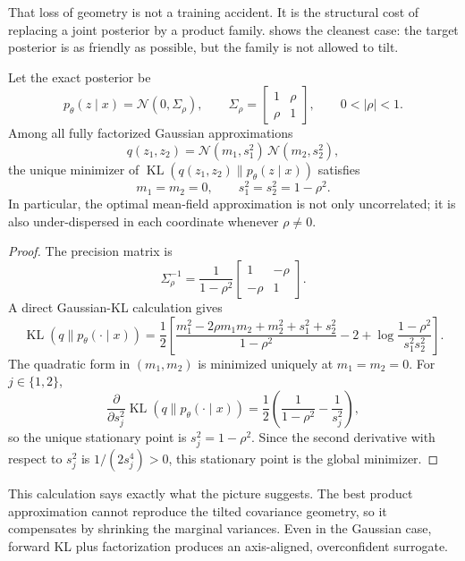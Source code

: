 \documentclass[11pt]{article}
\begin{document}
That loss of geometry is not a training accident.
It is the structural cost of replacing a joint posterior by a product family.
 shows the cleanest case:
the target posterior is as friendly as possible, but the family is not allowed to tilt.

\begin{proposition}
\label{prop:mfvi-gaussian-underdispersion}
Let the exact posterior be
\[
  p_\theta(z\mid x)=\mathcal{N}(0,\Sigma_\rho),
  \qquad
  \Sigma_\rho=
  \begin{bmatrix}
    1 & \rho\\
    \rho & 1
  \end{bmatrix},
  \qquad
  0<|\rho|<1.
\]
Among all fully factorized Gaussian approximations
\[
  q(z_1,z_2)=\mathcal{N}(m_1,s_1^2)\,\mathcal{N}(m_2,s_2^2),
\]
the unique minimizer of
\(\operatorname{KL}(q(z_1,z_2)\|p_\theta(z\mid x))\) satisfies
\[
  m_1=m_2=0,
  \qquad
  s_1^2=s_2^2=1-\rho^2.
\]
In particular, the optimal mean-field approximation is not only uncorrelated; it is also under-dispersed in each coordinate whenever \(\rho\neq 0\).
\end{proposition}
\begin{proof}
The precision matrix is
\[
  \Sigma_\rho^{-1}
  =
  \frac{1}{1-\rho^2}
  \begin{bmatrix}
    1 & -\rho\\
    -\rho & 1
  \end{bmatrix}.
\]
A direct Gaussian-KL calculation gives
\[
  \operatorname{KL}(q\|p_\theta(\cdot\mid x))
  =
  \frac12\left[
    \frac{m_1^2-2\rho m_1m_2+m_2^2+s_1^2+s_2^2}{1-\rho^2}
    -2
    +
    \log\!\frac{1-\rho^2}{s_1^2s_2^2}
  \right].
\]
The quadratic form in \((m_1,m_2)\) is minimized uniquely at \(m_1=m_2=0\).
For \(j\in\{1,2\}\),
\[
  \frac{\partial}{\partial s_j^2}\operatorname{KL}(q\|p_\theta(\cdot\mid x))
  =
  \frac12\left(\frac{1}{1-\rho^2}-\frac{1}{s_j^2}\right),
\]
so the unique stationary point is \(s_j^2=1-\rho^2\).
Since the second derivative with respect to \(s_j^2\) is \(1/(2s_j^4)>0\), this stationary point is the global minimizer.%
\end{proof}

This calculation says exactly what the picture suggests.
The best product approximation cannot reproduce the tilted covariance geometry, so it compensates by shrinking the marginal variances.
Even in the Gaussian case, forward KL plus factorization produces an axis-aligned, overconfident surrogate.
\end{document}
